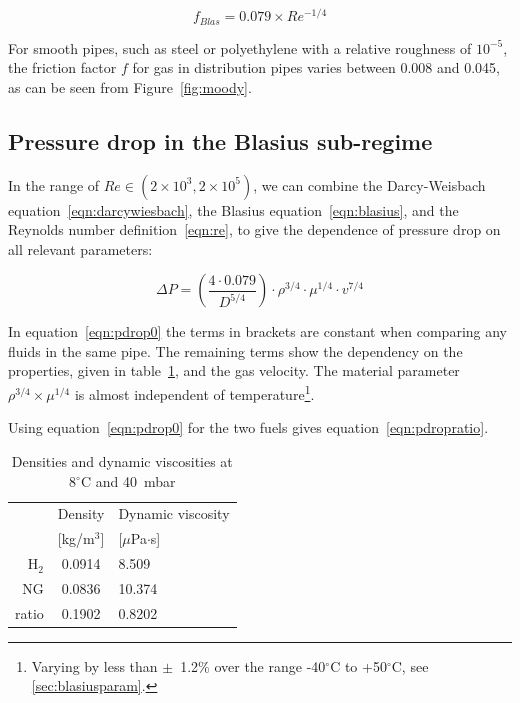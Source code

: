 \documentclass[5p]{elsarticle} %
\begin{document}
\begin{equation}
\label{eqn:blasius}
f_{Blas} = 0.079 \times Re^{-1/4}
\end{equation}

For smooth pipes, such as steel or polyethylene with a relative roughness of $10^{-5}$, the friction factor $f$ for gas in distribution pipes varies between 0.008 and 0.045, as can be seen from Figure~\ref{fig:moody}.

\subsection{Pressure drop in the Blasius sub-regime}
\label{sec:pressuredrop}

In the range of $Re \in (2\times10^3,2\times10^5)$, we can combine the Darcy-Weisbach equation~\eqref{eqn:darcywiesbach}, the Blasius equation~\eqref{eqn:blasius}, and the Reynolds number definition~\eqref{eqn:re}, to give the dependence of pressure drop on all relevant parameters:

\begin{equation}
\label{eqn:pdrop0}
\Delta P = \left ( \frac{4 \cdot 0.079}{D^{5/4}}\right ) \cdot \rho^{3/4} \cdot \mu^{1/4} \cdot v^{7/4}
\end{equation}

In equation~\eqref{eqn:pdrop0} the terms in brackets are constant when comparing any fluids in the same pipe. 
The remaining terms show the dependency on 
the
properties, given in table~\ref{tab:dyn}, and the gas velocity.
The  material parameter $\rho^{3/4} \times \mu^{1/4}$ is almost independent of 
temperature\footnote{
Varying by less than $\pm$~1.2\% over the range -40$^\circ$C to +50$^\circ$C, see \ref{sec:blasiusparam}.
}.

Using equation~\eqref{eqn:pdrop0} for the two fuels gives equation~\eqref{eqn:pdropratio}.

\begin{table}
\centering
\begin{tabular}{r|c|l}
& Density & Dynamic viscosity \\
& [kg/m$^3$] & [$\mu$Pa$\cdot$s] \\
\hline
H$_2$ & 0.0914 & 8.509 \\
NG & 0.0836 & 10.374 \\
\hline
ratio & 0.1902 & 0.8202
\end{tabular}
\caption{\label{tab:dyn}Densities and dynamic viscosities at 8$^\circ$C and 40~mbar }
\end{table}
\end{document}
